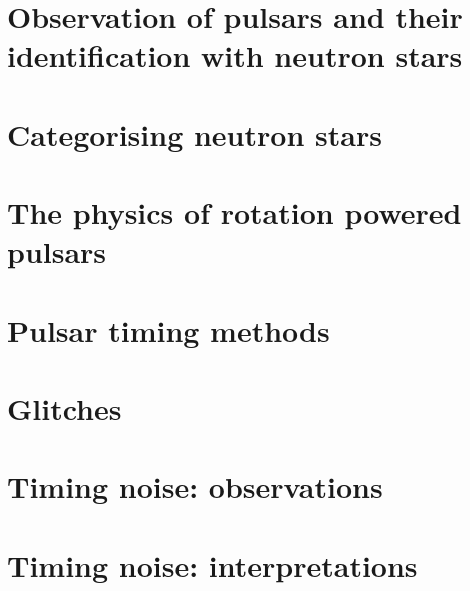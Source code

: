 \documentclass[../full_thesis/full_thesis.tex]{subfiles}
\newcommand{\IntroductionDir}{../introduction}
\begin{document}
 



\section{Observation of pulsars and their identification with neutron stars}


\section{Categorising neutron stars}


\section{The physics of rotation powered pulsars} 
\label{sec: rotation powered pulsars}


\FloatBarrier
%

\section{Pulsar timing methods}
\label{sec: pulsar timing methods}


\section{Glitches}
\label{ref: glitches}


\section{Timing noise: observations}
\label{sec: timing noise observations}


\section{Timing noise: interpretations}
\label{sec: timing noise interpretations}


\biblio
\end{document}
